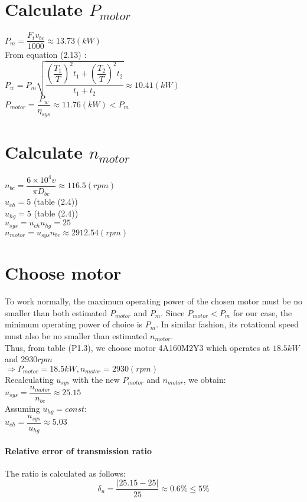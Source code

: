 \section{Calculate $ P_{motor} $}
$ P_m = \dfrac{F_tv_{bc}}{1000} \approx 13.73 \unit{(kW)}$\\
From equation (2.13) :\\
$ P_w = P_m\sqrt{\dfrac{\left(\dfrac{T_1}{T}\right)^2t_1 + \left(\dfrac{T_2}{T}\right)^2t_2}{t_1+t_2}} \approx 10.41 \unit{(kW)} $\\
$ P_{motor} = \dfrac{P_w}{\eta_{sys}} \approx 11.76\unit{(kW)} < P_m$

\section{Calculate $ n_{motor} $}
$ n_{bc} = \dfrac{6\times10^4v}{\pi D_{bc}} \approx 116.5 \unit{(rpm)}$\\
$ u_{ch} = 5$ (table (2.4))\\
$ u_{hg} = 5$ (table (2.4))\\
$ u_{sys} = u_{ch}u_{hg} = 25 $\\
$ n_{motor} = u_{sys}n_{bc} \approx 2912.54  \unit{(rpm)} $

\section{Choose motor}
To work normally, the maximum operating power of the chosen motor must be no smaller than both estimated $ P_{motor} $ and $ P_m $. Since $ P_{motor} < P_m $ for our case, the minimum operating power of choice is $ P_m $. In similar fashion, its rotational speed must also be no smaller than estimated $ n_{motor} $.\\
Thus, from table (P1.3), we choose motor 4A160M2Y3 which operates at $ 18.5\unit{kW} $ and $ 2930\unit{rpm} $\\
$\Rightarrow P_{motor} = 18.5\unit{kW}, n_{motor} = 2930\unit{(rpm)}$\\
Recalculating $ u_{sys} $ with the new $ P_{motor} $ and $ n_{motor} $, we obtain:\\
$ u_{sys} = \dfrac{n_{motor}}{n_{bc}} \approx 25.15	$\\
Assuming $ u_{hg} = const $:\\
$ u_{ch} = \dfrac{u_{sys}}{u_{hg}} \approx 5.03$
\paragraph{Relative error of transmission ratio} The ratio is calculated as follows:
\[\delta_u=\dfrac{|25.15-25|}{25} \approx 0.6\% \leq  5\%\]


